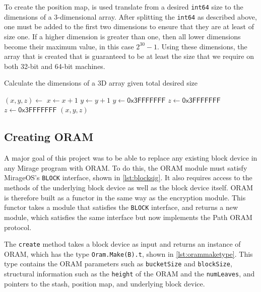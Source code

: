 \documentclass[12pt,a4paper,twoside,openright]{report}
\begin{document}
To create the position map,  is used translate from a desired \texttt{int64} size to the dimensions of a 3-dimensional array. After splitting the \texttt{int64} as described above, one must be added to the first two dimensions to ensure that they are at least of size one. If a higher dimension is greater than one, then all lower dimensions become their maximum value, in this case $2^{30}-1$. Using these dimensions, the array that is created that is guaranteed to be at least the size that we require on both 32-bit and 64-bit machines.

\begin{algorithm}[t]
\caption{Calculate the dimensions of a 3D array given total desired size}
\label{alg:posmapdims}
\footnotesize
\begin{algorithmic}[1]
\vskip 10pt
\vskip 10pt
\vskip 10pt
	\State $(x, y, z) \gets$ 
\vskip 10pt
	\State $x \gets x + 1$
	\State $y \gets y + 1$
\vskip 10pt
		\State $y \gets \mathsf{0x3FFFFFFF}$
		\State $z \gets \mathsf{0x3FFFFFFF}$
		\State $z \gets \mathsf{0x3FFFFFFF}$
	\EndIf
\vskip 10pt
	\State \Return $(x,y,z)$
\vskip 10pt
\EndFunction
\vskip 10pt
\end{algorithmic}
\end{algorithm}

\subsection{Creating ORAM}

A major goal of this project was to be able to replace any existing block device in any Mirage program with ORAM. To do this, the ORAM module must satisfy MirageOS's \texttt{BLOCK} interface, shown in \cref{lst:blocksig}. It also requires access to the methods of the underlying block device as well as the block device itself. ORAM is therefore built as a functor in the same way as the encryption module. This functor takes a module that satisfies the \texttt{BLOCK} interface, and returns a new module, which satisfies the same interface but now implements the Path ORAM protocol.

The \texttt{create} method takes a block device as input and returns an instance of ORAM, which has the type \texttt{Oram.Make(B).t}, shown in \cref{lst:orammaketype}. This type contains the ORAM parameters such as \texttt{bucketSize} and \texttt{blockSize}, structural information such as the \texttt{height} of the ORAM and the \texttt{numLeaves}, and pointers to the stash, position map, and underlying block device.
\end{document}
